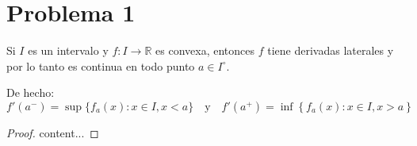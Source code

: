 \section{Problema 1}

Si $I$ es un intervalo y $f:I\to\mathbb{R}$ es convexa, entonces $f$ tiene derivadas laterales y por lo tanto es continua en todo punto $a\in I^{\circ}$. 
\newline

De hecho: 
$$f'(a^-)=\sup\{f_a(x):x\in I, x<a\} \quad \text{y} \quad f'(a^+)=\inf\left\{f_a(x):x\in I,x>a\right\}$$

\begin{proof}
	content...
\end{proof}